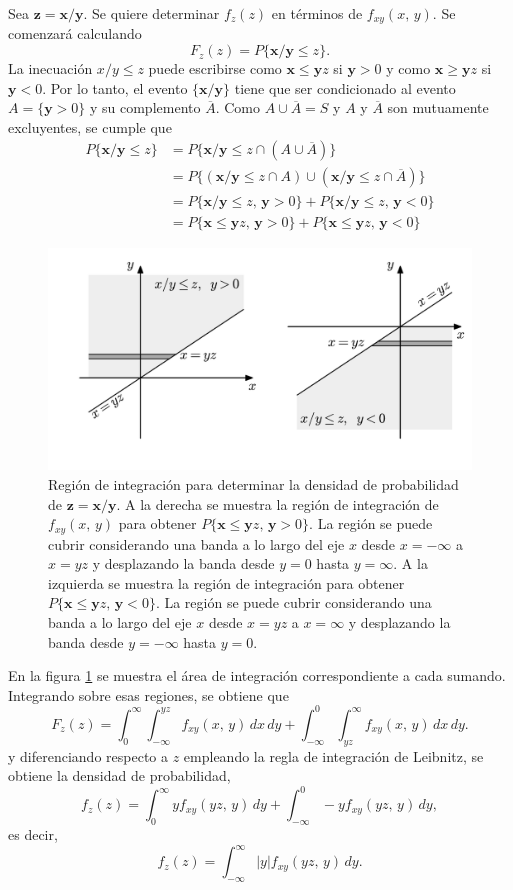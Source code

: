 \documentclass[a4paper]{report}
\newcommand{\x}{\mathbf{x}}
\newcommand{\y}{\mathbf{y}}
\newcommand{\z}{\mathbf{z}}
\begin{document}
Sea \(\z=\x/\y\). Se quiere determinar \(f_z(z)\) en términos de \(f_{xy}(x,\,y)\). Se comenzará calculando
\[
 F_z(z)=P\{\x/\y\leq z\}.
\]
La inecuación \(x/y\leq z\) puede escribirse como \(\x\leq \y z\) si \(\y>0\) y como \(\x\geq\y z\) si \(\y<0\). Por lo tanto, el evento \(\{\x/\y\}\) tiene que ser condicionado al evento \(A=\{\y>0\}\) y su complemento \(\overline{A}\). Como \(A\cup\overline{A}=S\) y \(A\) y \(\overline{A}\) son mutuamente excluyentes, se cumple que
\begin{align*}
 P\{\x/\y\leq z\}&=P\{\x/\y\leq z\cap(A\cup\overline{A})\}\\
   &=P\{(\x/\y\leq z\cap A)\cup(\x/\y\leq z\cap\overline{A})\}\\
   &=P\{\x/\y\leq z,\,\y>0\}+P\{\x/\y\leq z,\,\y<0\}\\
   &=P\{\x\leq\y z,\,\y>0\}+P\{\x\leq\y z,\,\y<0\}
\end{align*}
\begin{figure}[!htb]
\begin{center}
\includegraphics[width=0.75\columnwidth]{figuras/joint_distribution_region_rv_product.pdf}
\caption{\label{fig:joint_distribution_region_rv_product} Región de integración para determinar la densidad de probabilidad de \(\z=\x/\y\). A la derecha se muestra la región de integración de \(f_{xy}(x,\,y)\) para obtener \(P\{\x\leq\y z,\,\y>0\}\). La región se puede cubrir considerando una banda a lo largo del eje \(x\) desde \(x=-\infty\) a \(x=yz\) y desplazando la banda desde \(y=0\) hasta \(y=\infty\). A la izquierda se muestra la región de integración para obtener \(P\{\x\leq\y z,\,\y<0\}\). La región se puede cubrir considerando una banda a lo largo del eje \(x\) desde \(x=yz\) a \(x=\infty\) y desplazando la banda desde \(y=-\infty\) hasta \(y=0\).}
\end{center}
\end{figure}
En la figura \ref{fig:joint_distribution_region_rv_product} se muestra el área de integración correspondiente a cada sumando. Integrando sobre esas regiones, se obtiene que
\[
 F_z(z)=\int_{0}^{\infty}\int_{-\infty}^{yz}f_{xy}(x,\,y)\,dx\,dy+
   \int_{-\infty}^{0}\int_{yz}^{\infty}f_{xy}(x,\,y)\,dx\,dy.
\]
y diferenciando respecto a \(z\) empleando la regla de integración de Leibnitz, se obtiene la densidad de probabilidad,
\[
 f_z(z)=\int_{0}^{\infty}yf_{xy}(yz,\,y)\,dy+\int_{-\infty}^{0}-yf_{xy}(yz,\,y)\,dy,
\]
es decir,
\begin{equation}\label{eq:pdf_of_product_of_two_rv}
 f_z(z)=\int_{-\infty}^{\infty}|y|f_{xy}(yz,\,y)\,dy.
\end{equation}
\end{document}
